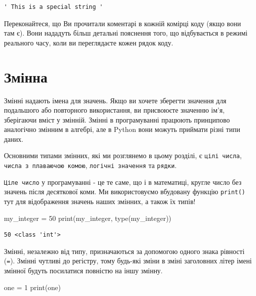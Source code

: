 \documentclass[
  letterpaper,
]{report}
\newenvironment{Shaded}{\begin{snugshade}}{\end{snugshade}}
\newcommand{\BuiltInTok}[1]{\textcolor[rgb]{0.00,0.23,0.31}{#1}}
\newcommand{\DecValTok}[1]{\textcolor[rgb]{0.68,0.00,0.00}{#1}}
\newcommand{\NormalTok}[1]{\textcolor[rgb]{0.00,0.23,0.31}{#1}}
\newcommand{\OperatorTok}[1]{\textcolor[rgb]{0.37,0.37,0.37}{#1}}
\begin{document}
\begin{verbatim}
' This is a special string '
\end{verbatim}

Переконайтеся, що Ви прочитали коментарі в кожній комірці коду (якщо
вони там є). Вони нададуть більш детальні пояснення того, що
відбувається в режимі реального часу, коли ви переглядаєте кожен рядок
коду.

\hypertarget{ux437ux43cux456ux43dux43dux430}{%
\section{Змінна}\label{ux437ux43cux456ux43dux43dux430}}

Змінні надають імена для значень. Якщо ви хочете зберегти значення для
подальшого або повторного використання, ви присвоюєте значенню ім'я,
зберігаючи вміст у змінній. Змінні в програмуванні працюють принципово
аналогічно змінним в алгебрі, але в Python вони можуть приймати різні
типи даних.

Основними типами змінних, які ми розглянемо в цьому розділі, є
\texttt{цілі\ числа}, \texttt{числа\ з\ плаваючою\ комою},
\texttt{логічні\ значення} та \texttt{рядки}.

\texttt{Ціле\ число} у програмуванні - це те саме, що і в математиці,
кругле число без значень після десяткової коми. Ми використовуємо
вбудовану функцію \texttt{print()} тут для відображення значень наших
змінних, а також їх типів!

\begin{Shaded}
\begin{Highlighting}[]
\NormalTok{my\_integer }\OperatorTok{=} \DecValTok{50}
\BuiltInTok{print}\NormalTok{(my\_integer, }\BuiltInTok{type}\NormalTok{(my\_integer))}
\end{Highlighting}
\end{Shaded}

\begin{verbatim}
50 <class 'int'>
\end{verbatim}

Змінні, незалежно від типу, призначаються за допомогою одного знака
рівності (\texttt{=}). Змінні чутливі до регістру, тому будь-які зміни в
зміні заголовних літер імені змінної будуть посилатися повністю на іншу
змінну.

\begin{Shaded}
\begin{Highlighting}[]
\NormalTok{one }\OperatorTok{=} \DecValTok{1}
\BuiltInTok{print}\NormalTok{(one)}
\end{Highlighting}
\end{Shaded}
\end{document}
